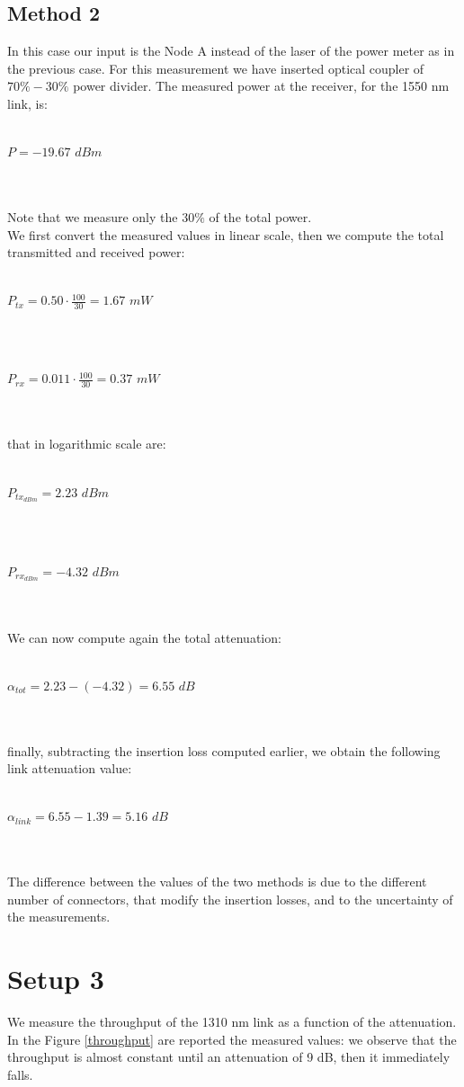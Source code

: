 \documentclass[a4paper,10pt]{report}
\begin{document}
\subsection*{Method 2}
In this case our input is the Node A instead of the laser of the power meter as in the previous case.
For this measurement we have inserted optical coupler of $70\%-30\%$ power divider.
The measured power at the receiver, for the 1550 nm link, is:\\\\
\centerline{ $P=-19.67$ $dBm$}\\\\
Note that we measure only the $30 \%$ of the total power.\\
We first convert the measured values in linear scale, then we compute the total transmitted and received power:\\\\
\centerline{ $P_{tx}=0.50 \cdot \frac{100}{30} = 1.67$ $mW$}\\\\
\centerline{ $P_{rx}=0.011 \cdot \frac{100}{30} = 0.37$ $mW$}\\\\
that in logarithmic scale are:\\\\
\centerline{ $P_{tx_{dBm}}= 2.23$ $dBm$}\\\\
\centerline{ $P_{rx_{dBm}} = -4.32$ $dBm$}\\\\
We can now compute again the total attenuation:\\\\
\centerline{$\alpha_{tot} = 2.23 - (-4.32) = 6.55 $ $dB$}\\\\
finally, subtracting the insertion loss computed earlier, we obtain the fol\-lowing link attenuation value:\\\\
\centerline{$\alpha_{link} = 6.55 - 1.39 = 5.16 $ $dB$}\\\\

The difference between the values of the two methods is due to the different number of connectors, that modify the
insertion losses, and to the uncertainty of the measurements.

\newpage
\section*{Setup 3}
We measure the throughput of the 1310 nm link as a function of the attenuation.\\
In the Figure \ref{throughput} are reported the measured values:
we observe that the throughput is almost constant until an attenuation of 9 dB, then it immediately falls.
\end{document}
